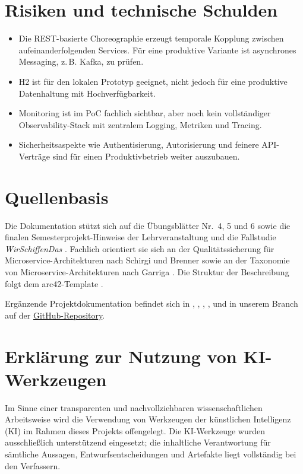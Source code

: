 \section{Risiken und technische Schulden}
\begin{itemize}
  \item Die REST-basierte Choreographie erzeugt temporale Kopplung zwischen aufeinanderfolgenden Services. 
  Für eine produktive Variante ist asynchrones Messaging, z.\,B. Kafka, zu prüfen.
  \item H2 ist für den lokalen Prototyp geeignet, nicht jedoch für eine produktive Datenhaltung mit Hochverfügbarkeit.
  \item Monitoring ist im PoC fachlich sichtbar, aber noch kein vollständiger Observability-Stack mit zentralem Logging, 
  Metriken und Tracing.
  \item Sicherheitsaspekte wie Authentisierung, Autorisierung und feinere API-Verträge sind für einen Produktivbetrieb weiter auszubauen.
\end{itemize}

\section{Quellenbasis}
Die Dokumentation stützt sich auf die Übungsblätter Nr.~4, 5 und 6 sowie die finalen Semesterprojekt-Hinweise der Lehrveranstaltung \cite{uebungsblaetter2026} und die Fallstudie \emph{WirSchiffenDas} \cite{fallstudie2026}. Fachlich orientiert sie sich an der Qualitätssicherung für Microservice-Architekturen nach Schirgi und Brenner \cite{schirgi2021quality} sowie an der Taxonomie von Microservice-Architekturen nach Garriga \cite{garriga2018taxonomy}. Die Struktur der Beschreibung folgt dem arc42-Template \cite{starke2017arc42}.

Ergänzende Projektdokumentation befindet sich in , , , ,  und  in unserem Branch auf der \href{https://github.com/yunusemresirin/WirSchiffenDas/tree/main/docs}{GitHub-Repository}.

\section{Erklärung zur Nutzung von KI-Werkzeugen}
Im Sinne einer transparenten und nachvollziehbaren wissenschaftlichen Arbeitsweise wird die Verwendung von Werkzeugen der künstlichen Intelligenz (KI) im Rahmen dieses Projekts offengelegt. Die KI-Werkzeuge wurden ausschlie\ss{}lich unterstützend eingesetzt; die inhaltliche Verantwortung für sämtliche Aussagen, Entwurfsentscheidungen und Artefakte liegt vollständig bei den Verfassern.

